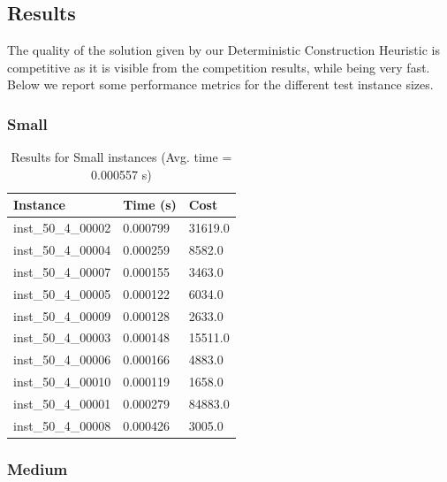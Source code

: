 \documentclass{article}
\begin{document}
\subsection*{Results}
The quality of the solution given by our Deterministic Construction Heuristic is competitive as it is visible from the competition results, while being very fast. Below we report some performance metrics for the different test instance sizes.

\subsubsection*{Small}
\begin{table}[h!]
\centering
\begin{tabular}{|l|l|l|}
\hline
\textbf{Instance}         & \textbf{Time (s)} & \textbf{Cost} \\ \hline
inst\_50\_4\_00002 & 0.000799 & 31619.0 \\ \hline
inst\_50\_4\_00004 & 0.000259 & 8582.0  \\ \hline
inst\_50\_4\_00007 & 0.000155 & 3463.0  \\ \hline
inst\_50\_4\_00005 & 0.000122 & 6034.0  \\ \hline
inst\_50\_4\_00009 & 0.000128 & 2633.0  \\ \hline
inst\_50\_4\_00003 & 0.000148 & 15511.0 \\ \hline
inst\_50\_4\_00006 & 0.000166 & 4883.0  \\ \hline
inst\_50\_4\_00010 & 0.000119 & 1658.0  \\ \hline
inst\_50\_4\_00001 & 0.000279 & 84883.0 \\ \hline
inst\_50\_4\_00008 & 0.000426 & 3005.0  \\ \hline
\end{tabular}
\caption{Results for Small instances (Avg. time = 0.000557 s)}
\end{table}

\subsubsection*{Medium}
\end{document}
